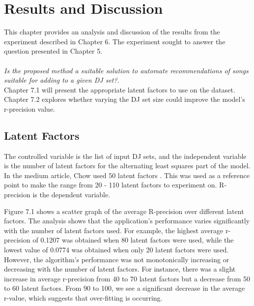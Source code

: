 
\graphicspath{{Chapter6/}}

\chapter{Results and Discussion}

This chapter provides an analysis and discussion of the results from the experiment described
in Chapter 6. The experiment sought to answer the question presented in Chapter 5.
\\
\\
\textit{Is the proposed method a suitable solution to automate recommendations of songs suitable for adding to a given DJ set?}.
\\

Chapter 7.1 will present the appropriate latent factors to use on the dataset. Chapter 7.2 explores whether varying the DJ set size could improve the model's r-precision value.

\section{Latent Factors}
The controlled variable is the list of input DJ sets, and the independent variable is the number of latent factors for the alternating least squares part of the model. In the medium article, Chow used 50 latent factors \citep{chow_music_2020}. This was used as a reference point to make the range from 20 - 110 latent factors to experiment on. R-precision is the dependent variable.

Figure 7.1 shows a scatter graph of the average R-precision over different latent factors. The analysis shows that the application's performance varies significantly with the number of latent factors used. For example, the highest average r-precision of 0.1207 was obtained when 80 latent factors were used, while the lowest value of 0.0774 was obtained when only 20 latent factors were used. However, the algorithm's performance was not monotonically increasing or decreasing with the number of latent factors. For instance, there was a slight increase in average r-precision from 40 to 70 latent factors but a decrease from 50 to 60 latent factors. From 90 to 100, we see a significant decrease in the average r-value, which suggests that over-fitting is occurring.

